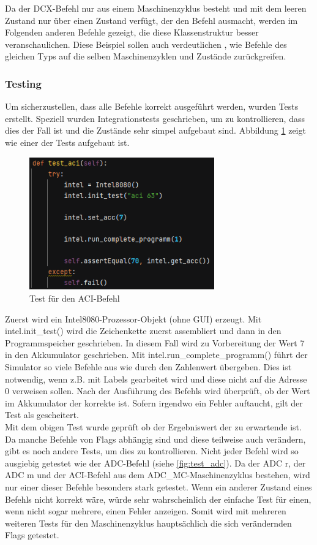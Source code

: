 \documentclass[12pt]{article}
\newcommand{\imgSpaceBefore}{\vspace{10pt}}
\begin{document}
\noindent
Da der DCX-Befehl nur aus einem Maschinenzyklus besteht und mit dem leeren Zustand nur über einen Zustand verfügt, der den Befehl ausmacht, werden im Folgenden anderen Befehle gezeigt, die diese Klassenstruktur besser veranschaulichen. Diese Beispiel sollen auch verdeutlichen , wie Befehle des gleichen Typs auf die selben Maschinenzyklen und Zustände zurückgreifen.

\subsubsection{Testing}
Um sicherzustellen, dass alle Befehle korrekt ausgeführt werden, wurden Tests erstellt. 
Speziell wurden Integrationstests geschrieben, um zu kontrollieren, dass dies der Fall ist und die Zustände sehr simpel aufgebaut sind. Abbildung \ref{fig:test_aci} zeigt wie einer der Tests aufgebaut ist. 

\imgSpaceBefore
\begin{figure}[H]
\centering
\includegraphics[width=8cm]{bilder/test_aci}
\caption{Test für den ACI-Befehl}
\label{fig:test_aci}
\end{figure}

\noindent
Zuerst wird ein Intel8080-Prozessor-Objekt (ohne GUI) erzeugt. Mit intel.init\_test() wird die Zeichenkette zuerst assembliert und dann in den Programmspeicher geschrieben. In diesem Fall wird zu Vorbereitung der Wert 7 in den Akkumulator geschrieben. Mit intel.run\_complete\_programm() führt der Simulator so viele Befehle aus wie durch den Zahlenwert übergeben. Dies ist notwendig, wenn z.B. mit Labels gearbeitet wird und diese nicht auf die Adresse 0 verweisen sollen. Nach der Ausführung des Befehls wird überprüft, ob der Wert im Akkumulator der korrekte ist. Sofern irgendwo ein Fehler auftaucht, gilt der Test als gescheitert.
\\

\noindent
Mit dem obigen Test wurde geprüft ob der Ergebniswert der zu erwartende ist. Da manche Befehle  von Flags abhängig sind und diese teilweise auch verändern, gibt es noch andere Tests, um dies zu kontrollieren. Nicht jeder Befehl wird so ausgiebig getestet wie der ADC-Befehl (siehe \ref{fig:test_adc}). Da der ADC r, der ADC m und der ACI-Befehl aus dem ADC\_MC-Maschinenzyklus bestehen, wird nur einer dieser Befehle besonders stark getestet. Wenn ein anderer Zustand eines Befehls nicht korrekt wäre, würde sehr wahrscheinlich der einfache Test für einen, wenn nicht sogar mehrere, einen Fehler anzeigen. Somit wird mit mehreren weiteren Tests für den Maschinenzyklus hauptsächlich die sich verändernden Flags getestet.
\end{document}

